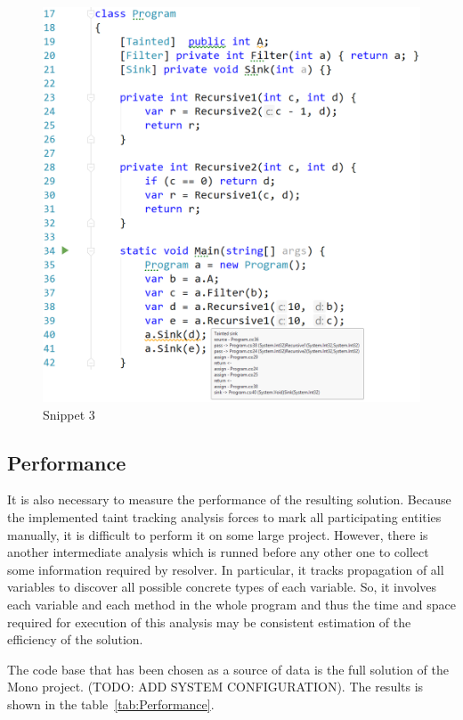 \begin{figure}[h]
	\includegraphics[width=\linewidth]{screenshots/Recursion.png}
	\caption{Snippet 3}
	\label{fig:Recursion}
\end{figure}

\subsection{Performance}

It is also necessary to measure the performance of the resulting solution.
Because the implemented taint tracking analysis forces to mark all participating entities manually, it is difficult to perform it on some large project.
However, there is another intermediate analysis which is runned before any other one to collect some information required by resolver.
In particular, it tracks propagation of all variables to discover all possible concrete types of each variable.
So, it involves each variable and each method in the whole program and thus the time and space required for execution of this analysis may be consistent estimation of the efficiency of the solution.

The code base that has been chosen as a source of data is the full solution of the Mono project.
(TODO: ADD SYSTEM CONFIGURATION).
The results is shown in the table~\ref{tab:Performance}.

